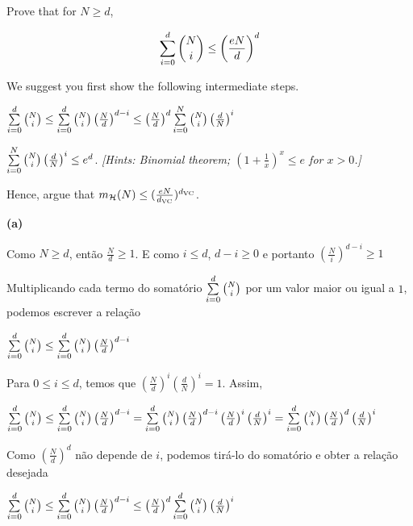 \begin{enunciado}{6}
    Prove that for $N \ge d$,
    
    $$\sum\limits_{i=0}^{d} {{N} \choose {i}} \le \left( \frac{eN}{d} \right)^d$$
    
    We suggest you first show the following intermediate steps.
    
     $\sum\limits_{i=0}^{d}{{N} \choose {i}} \le 
    \sum\limits_{i=0}^{d}{{N} \choose {i}} \left( \frac{N}{d} \right)^{d-i} \le
    \left( \frac{N}{d} \right)^{d} \sum\limits_{i=0}^{N}{{N} \choose {i}} \left( \frac{d}{N} \right)^{i}$
    
     $\sum\limits_{i=0}^{N}{{N} \choose {i}} \left( \frac{d}{N} \right)^{i} \le e^d$. \textit{[Hints: Binomial theorem; $(1 + \frac{1}{x})^x \le e$ for $x > 0$.]}
    
    Hence, argue that $m_{\mathcal{H}}(N) \le (\frac{eN}{d_{\text{VC}}})^{d_{\text{VC}}}$.
\end{enunciado}

\textbf{(a)}

Como $N \ge d$, então $\frac{N}{d} \ge 1$. E como $i \le d$, $d - i \ge 0$ e portanto $\left(\frac{N}{i} \right)^{d-i} \ge 1$

Multiplicando cada termo do somatório $\sum\limits_{i=0}^{d} {{N} \choose {i}}$ por um valor maior ou igual a $1$, podemos escrever a relação

$\sum\limits_{i=0}^{d} {{N} \choose {i}} \le \sum\limits_{i=0}^{d} {{N} \choose {i}}\left(\frac{N}{d}\right)^{d-i}$

Para $0 \le i \le d$, temos que $\left(\frac{N}{d}\right)^{i}\left(\frac{d}{N}\right)^{i} = 1$. Assim,

$\sum\limits_{i=0}^{d} {{N} \choose {i}} \le \sum\limits_{i=0}^{d} {{N} \choose {i}}\left(\frac{N}{d}\right)^{d-i}=
\sum\limits_{i=0}^{d} {{N} \choose {i}}\left(\frac{N}{d}\right)^{d-i}
\left(\frac{N}{d}\right)^{i}\left(\frac{d}{N}\right)^{i} = 
\sum\limits_{i=0}^{d} {{N} \choose {i}}\left(\frac{N}{d}\right)^{d}
\left(\frac{d}{N}\right)^{i}
$

Como $\left(\frac{N}{d}\right)^d$ não depende de $i$, podemos tirá-lo do somatório e obter a relação desejada

$\sum\limits_{i=0}^{d} {{N} \choose {i}} \le \sum\limits_{i=0}^{d} {{N} \choose {i}}\left(\frac{N}{d}\right)^{d-i} \le
\left(\frac{N}{d}\right)^{d} \sum\limits_{i=0}^{d} {{N} \choose {i}}
\left(\frac{d}{N}\right)^{i}
$\cqd

\vspace{1cm}

